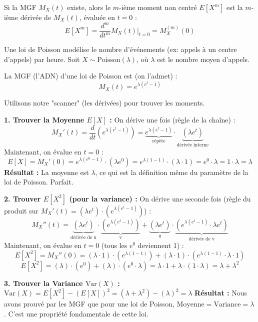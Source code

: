 \begin{theorembox}
Si la MGF $M_X(t)$ existe, alors le $m$-ième moment non centré $E[X^m]$ est la $m$-ième dérivée de $M_X(t)$, évaluée en $t=0$ :
$$ E[X^m] = \frac{d^m}{dt^m} M_X(t) \bigg|_{t=0} = M_X^{(m)}(0) $$
\end{theorembox}

\begin{examplebox}
Une loi de Poisson modélise le nombre d'événements (ex: appels à un centre d'appels) par heure. Soit $X \sim \text{Poisson}(\lambda)$, où $\lambda$ est le nombre moyen d'appels.

La MGF (l'ADN) d'une loi de Poisson est (on l'admet) :
$$ M_X(t) = e^{\lambda(e^t - 1)} $$

Utilisons notre "scanner" (les dérivées) pour trouver les moments.

\textbf{1. Trouver la Moyenne $E[X]$ :}
On dérive une fois (règle de la chaîne) :
$$ M_X'(t) = \frac{d}{dt} \left( e^{\lambda(e^t - 1)} \right) = \underbrace{e^{\lambda(e^t - 1)}}_{\text{répète}} \cdot \underbrace{(\lambda e^t)}_{\text{dérivée interne}} $$
Maintenant, on évalue en $t=0$ :
$$ E[X] = M_X'(0) = e^{\lambda(e^0 - 1)} \cdot (\lambda e^0) = e^{\lambda(1 - 1)} \cdot (\lambda \cdot 1) = e^0 \cdot \lambda = 1 \cdot \lambda = \lambda $$
\textbf{Résultat :} La moyenne est $\lambda$, ce qui est la définition même du paramètre de la loi de Poisson. Parfait.

\textbf{2. Trouver $E[X^2]$ (pour la variance) :}
On dérive une seconde fois (règle du produit sur $M_X'(t) = (\lambda e^t) \cdot (e^{\lambda(e^t - 1)})$) :
$$ M_X''(t) = \underbrace{(\lambda e^t)}_{\text{dérivée de u}} \cdot \underbrace{(e^{\lambda(e^t - 1)})}_{\text{v}} + \underbrace{(\lambda e^t)}_{\text{u}} \cdot \underbrace{(e^{\lambda(e^t - 1)} \cdot \lambda e^t)}_{\text{dérivée de v}} $$
Maintenant, on évalue en $t=0$ (tous les $e^0$ deviennent 1) :
$$ E[X^2] = M_X''(0) = (\lambda \cdot 1) \cdot (e^{\lambda(1-1)}) + (\lambda \cdot 1) \cdot (e^{\lambda(1-1)} \cdot \lambda \cdot 1) $$
$$ E[X^2] = (\lambda) \cdot (e^0) + (\lambda) \cdot (e^0 \cdot \lambda) = \lambda \cdot 1 + \lambda \cdot (1 \cdot \lambda) = \lambda + \lambda^2 $$

\textbf{3. Trouver la Variance $\text{Var}(X)$ :}
$\text{Var}(X) = E[X^2] - (E[X])^2 = (\lambda + \lambda^2) - (\lambda)^2 = \lambda$
\textbf{Résultat :} Nous avons prouvé par les MGF que pour une loi de Poisson, $\text{Moyenne} = \text{Variance} = \lambda$. C'est une propriété fondamentale de cette loi.
\end{examplebox}


